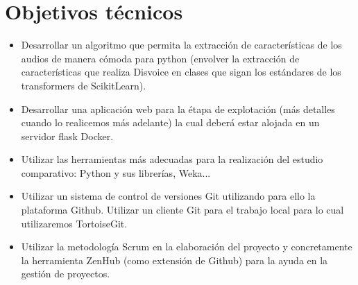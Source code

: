 \section{Objetivos técnicos}
\begin{itemize}
	\item Desarrollar un algoritmo que permita la extracción de características de los audios de manera cómoda para python (envolver la extracción de características que realiza Disvoice en clases que sigan los estándares de los transformers de ScikitLearn).
	\item Desarrollar una aplicación web para la étapa de explotación (más detalles cuando lo realicemos más adelante) la cual deberá estar alojada en un servidor flask Docker.
	\item Utilizar las herramientas más adecuadas para la realización del estudio comparativo: Python y sus librerías, Weka...
	\item Utilizar un sistema de control de versiones Git utilizando para ello la plataforma Github. Utilizar un cliente Git para el trabajo local para lo cual utilizaremos TortoiseGit.
	\item Utilizar la metodología Scrum en la elaboración del proyecto y concretamente la herramienta ZenHub (como extensión de Github) para la ayuda en la gestión de proyectos.
	
	
\end{itemize}